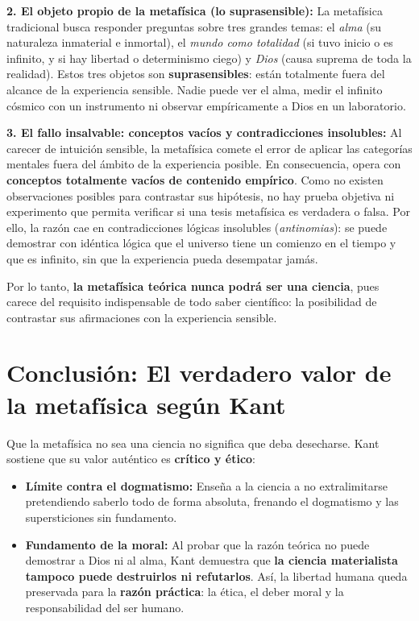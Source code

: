 \documentclass[a4paper, 11pt]{article}
\begin{document}
\textbf{2. El objeto propio de la metafísica (lo suprasensible):} La metafísica tradicional busca responder preguntas sobre tres grandes temas: el \textit{alma} (su naturaleza inmaterial e inmortal), el \textit{mundo como totalidad} (si tuvo inicio o es infinito, y si hay libertad o determinismo ciego) y \textit{Dios} (causa suprema de toda la realidad). Estos tres objetos son \textbf{suprasensibles}: están totalmente fuera del alcance de la experiencia sensible. Nadie puede ver el alma, medir el infinito cósmico con un instrumento ni observar empíricamente a Dios en un laboratorio.

\textbf{3. El fallo insalvable: conceptos vacíos y contradicciones insolubles:} Al carecer de intuición sensible, la metafísica comete el error de aplicar las categorías mentales fuera del ámbito de la experiencia posible. En consecuencia, opera con \textbf{conceptos totalmente vacíos de contenido empírico}. Como no existen observaciones posibles para contrastar sus hipótesis, no hay prueba objetiva ni experimento que permita verificar si una tesis metafísica es verdadera o falsa. Por ello, la razón cae en contradicciones lógicas insolubles (\textit{antinomias}): se puede demostrar con idéntica lógica que el universo tiene un comienzo en el tiempo y que es infinito, sin que la experiencia pueda desempatar jamás.

Por lo tanto, \textbf{la metafísica teórica nunca podrá ser una ciencia}, pues carece del requisito indispensable de todo saber científico: la posibilidad de contrastar sus afirmaciones con la experiencia sensible.

\section{Conclusión: El verdadero valor de la metafísica según Kant}

Que la metafísica no sea una ciencia no significa que deba desecharse. Kant sostiene que su valor auténtico es \textbf{crítico y ético}:
\begin{itemize}
    \item \textbf{Límite contra el dogmatismo:} Enseña a la ciencia a no extralimitarse pretendiendo saberlo todo de forma absoluta, frenando el dogmatismo y las supersticiones sin fundamento.
    \item \textbf{Fundamento de la moral:} Al probar que la razón teórica no puede demostrar a Dios ni al alma, Kant demuestra que \textbf{la ciencia materialista tampoco puede destruirlos ni refutarlos}. Así, la libertad humana queda preservada para la \textbf{razón práctica}: la ética, el deber moral y la responsabilidad del ser humano.
\end{itemize}
\end{document}
